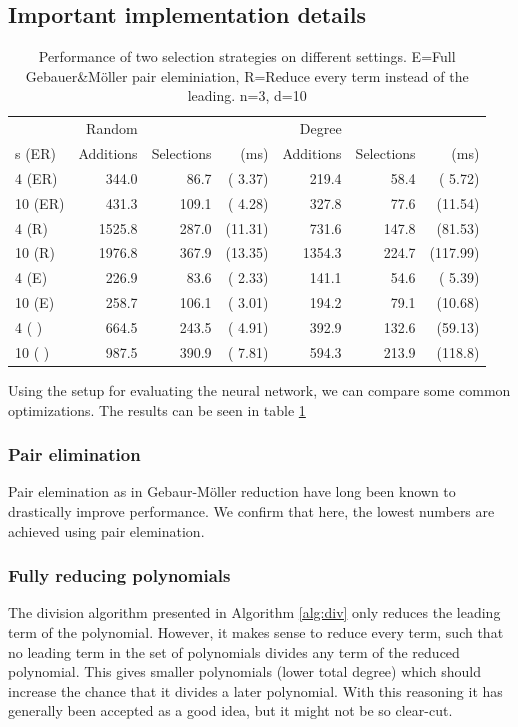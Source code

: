 \documentclass{article}
\theoremstyle{changedot}
\theoremstyle{changedotbreak}
\theoremstyle{nonumberplain}
\begin{document}
\subsection{Important implementation details}
\begin{table}[h]
  \begin{tabular}{l|rrr|rrr}
                 & Random & &             & Degree & & \\
    s   (ER) & Additions & Selections & (ms) & Additions & Selections & (ms) \\ \hline
    4 \hfill  (ER) &  344.0& 86.7 & ( 3.37) &  219.4& 58.4 & ( 5.72) \\
    10 \hfill  (ER) &  431.3&109.1 & ( 4.28) &  327.8& 77.6 & (11.54) \\
    4 \hfill   (R) & 1525.8&287.0 & (11.31) &  731.6&147.8 & (81.53) \\
    10 \hfill  (R) & 1976.8&367.9 & (13.35) & 1354.3&224.7 & (117.99) \\
    4 \hfill   (E) &  226.9& 83.6 & ( 2.33) &  141.1& 54.6 & ( 5.39) \\
    10 \hfill  (E) &  258.7&106.1 & ( 3.01) &  194.2& 79.1 & (10.68) \\
    4 \hfill   (  ) &  664.5&243.5 & ( 4.91) &  392.9&132.6 & (59.13) \\
    10 \hfill  (  ) &  987.5&390.9 & ( 7.81) &  594.3&213.9 & (118.8)
  \end{tabular}
  \caption{Performance of two selection strategies on different settings. E=Full Gebauer\&Möller pair eleminiation, R=Reduce every term instead of the leading. n=3, d=10}
  \label{tab:imp_details}
\end{table}

Using the setup for evaluating the neural network, we can compare some common optimizations. The results can be seen in table \ref{tab:imp_details}

\subsubsection{Pair elimination}
Pair elemination as in Gebaur-Möller reduction have long been known to drastically improve performance. We confirm that here, the lowest numbers are achieved using pair elemination.



\subsubsection{Fully reducing polynomials}
The division algorithm presented in Algorithm \ref{alg:div} only reduces the leading term of the polynomial. However, it makes sense to reduce every term, such that no leading term in the set of polynomials divides any term of the reduced polynomial. This gives smaller polynomials (lower total degree) which should increase the chance that it divides a later polynomial. With this reasoning it has generally been accepted as a good idea, but it might not be so clear-cut.
\end{document}
